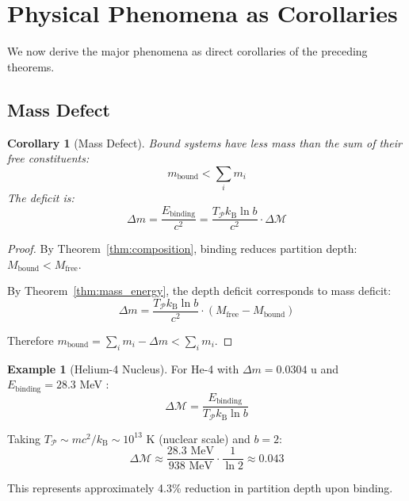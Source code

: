 \documentclass[twocolumn,10pt,a4paper]{article}
\newtheorem{corollary}[theorem]{Corollary}
\theoremstyle{definition}
\newtheorem{example}[theorem]{Example}
\theoremstyle{remark}
\newcommand{\kB}{k_{\mathrm{B}}}
\newcommand{\Partition}{\mathcal{P}}
\newcommand{\Depth}{\mathcal{M}}
\newcommand{\Mfree}{M_{\mathrm{free}}}
\newcommand{\Mbound}{M_{\mathrm{bound}}}
\begin{document}
\section{Physical Phenomena as Corollaries}
\label{sec:corollaries}

We now derive the major phenomena as direct corollaries of the preceding theorems.

\subsection{Mass Defect}

\begin{corollary}[Mass Defect]
\label{cor:mass_defect}
Bound systems have less mass than the sum of their free constituents:
\begin{equation}
    m_{\text{bound}} < \sum_{i} m_i
\end{equation}
The deficit is:
\begin{equation}
    \Delta m = \frac{E_{\text{binding}}}{c^2} = \frac{T_{\Partition} \kB \ln b}{c^2} \cdot \Delta\Depth
\end{equation}
\end{corollary}

\begin{proof}
By Theorem~\ref{thm:composition}, binding reduces partition depth: $\Mbound < \Mfree$.

By Theorem~\ref{thm:mass_energy}, the depth deficit corresponds to mass deficit:
\begin{equation}
    \Delta m = \frac{T_{\Partition} \kB \ln b}{c^2} \cdot (\Mfree - \Mbound)
\end{equation}

Therefore $m_{\text{bound}} = \sum_i m_i - \Delta m < \sum_i m_i$.
\end{proof}

\begin{example}[Helium-4 Nucleus]
For He-4 with $\Delta m = 0.0304$ u and $E_{\text{binding}} = 28.3$ MeV \cite{weizsacker1935,bethe1936}:
\begin{equation}
    \Delta\Depth = \frac{E_{\text{binding}}}{T_{\Partition} \kB \ln b}
\end{equation}

Taking $T_{\Partition} \sim mc^2/\kB \sim 10^{13}$ K (nuclear scale) and $b = 2$:
\begin{equation}
    \Delta\Depth \approx \frac{28.3 \text{ MeV}}{938 \text{ MeV}} \cdot \frac{1}{\ln 2} \approx 0.043
\end{equation}

This represents approximately 4.3\% reduction in partition depth upon binding.
\end{example}
\end{document}
